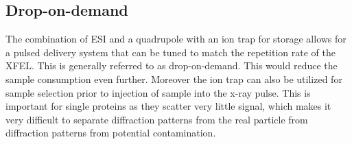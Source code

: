 \subsection{Drop-on-demand}
The combination of ESI and a quadrupole with an ion trap for storage allows for a pulsed delivery system that can be tuned to match the repetition rate of the XFEL. This is generally referred to as drop-on-demand. This would reduce the sample consumption even further. Moreover the ion trap can also be utilized for sample selection prior to injection of sample into the x-ray pulse. This is important for single proteins as they scatter very little signal, which makes it very difficult to separate diffraction patterns from the real particle from diffraction patterns from potential contamination. 

